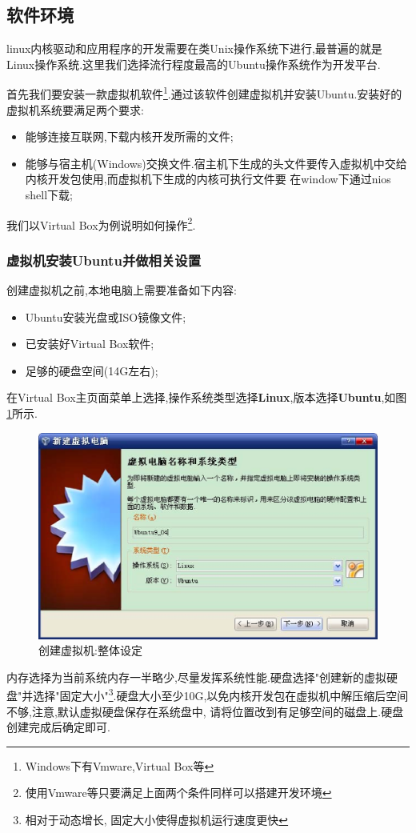 \documentclass[12pt,a4paper]{article}
\begin{document}
\subsection{软件环境}
linux内核驱动和应用程序的开发需要在类Unix操作系统下进行,最普遍的就是Linux操作系统.这里我们选择流行程度最高的Ubuntu操作系统作为开发平台.

首先我们要安装一款虚拟机软件\footnote{Windows下有Vmware,Virtual Box等}.通过该软件创建虚拟机并安装Ubuntu.安装好的虚拟机系统要满足两个要求:
\begin{itemize}
\item 能够连接互联网,下载内核开发所需的文件;
\item 能够与宿主机(Windows)交换文件.宿主机下生成的头文件要传入虚拟机中交给内核开发包使用,而虚拟机下生成的内核可执行文件要
在window下通过nios shell下载;
\end{itemize}

我们以Virtual Box为例说明如何操作\footnote{使用Vmware等只要满足上面两个条件同样可以搭建开发环境}.
\subsubsection{虚拟机安装Ubuntu并做相关设置}
创建虚拟机之前,本地电脑上需要准备如下内容:
\begin{itemize}
\item Ubuntu安装光盘或ISO镜像文件;
\item 已安装好Virtual Box软件;
\item 足够的硬盘空间(14G左右);
\end{itemize}

在Virtual Box主页面菜单上选择,操作系统类型选择\textbf{Linux},版本选择\textbf{Ubuntu},如图\ref{f_create_vb1}所示.
\begin{figure}[!bthp]
\centering\includegraphics[width=1\textwidth]{pic/f_create_vb1.eps}
\caption{创建虚拟机:整体设定\label{f_create_vb1}}
\end{figure}
内存选择为当前系统内存一半略少,尽量发挥系统性能.硬盘选择"创建新的虚拟硬盘"并选择"固定大小"\footnote{相对于动态增长,
固定大小使得虚拟机运行速度更快}.硬盘大小至少10G,以免内核开发包在虚拟机中解压缩后空间不够,{注意,默认虚拟硬盘保存在系统盘中,
请将位置改到有足够空间的磁盘上}.硬盘创建完成后确定即可.
\end{document}
